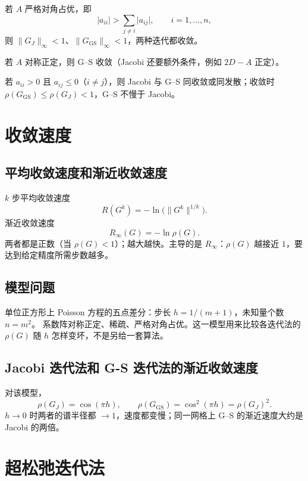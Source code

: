 若 \(A\) 严格对角占优，即
\[
\lvert a_{ii}\rvert>\sum_{j\neq i}\lvert a_{ij}\rvert,\qquad i=1,\ldots,n,
\]
则 \(\lVert G_J\rVert_{\infty}<1\)、\(\lVert G_{\mathrm{GS}}\rVert_{\infty}<1\)，两种迭代都收敛。

若 \(A\) 对称正定，则 G--S 收敛（Jacobi 还要额外条件，例如 \(2D-A\) 正定）。

若 \(a_{ii}>0\) 且 \(a_{ij}\le 0\)（\(i\neq j\)），则 Jacobi 与 G--S 同收敛或同发散；收敛时 \(\rho(G_{\mathrm{GS}})\le\rho(G_J)<1\)，G--S 不慢于 Jacobi。

\section{收敛速度}

\subsection{平均收敛速度和渐近收敛速度}

\(k\) 步平均收敛速度
\begin{equation}
R(G^k)=-\ln\bigl(\lVert G^k\rVert^{1/k}\bigr).
\end{equation}
渐近收敛速度
\begin{equation}
R_{\infty}(G)=-\ln\rho(G).
\end{equation}
两者都是正数（当 \(\rho(G)<1\)）；越大越快。主导的是 \(R_{\infty}\)：\(\rho(G)\) 越接近 \(1\)，要达到给定精度所需步数越多。

\subsection{模型问题}

单位正方形上 Poisson 方程的五点差分：步长 \(h=1/(m+1)\)，未知量个数 \(n=m^{2}\)。
系数阵对称正定、稀疏、严格对角占优。这一模型用来比较各迭代法的 \(\rho(G)\) 随 \(h\) 怎样变坏，不是另给一套算法。

\subsection{Jacobi 迭代法和 G-S 迭代法的渐近收敛速度}

对该模型，
\begin{equation}
\rho(G_J)=\cos(\pi h),\qquad
\rho(G_{\mathrm{GS}})=\cos^{2}(\pi h)=\rho(G_J)^{2}.
\end{equation}
\(h\to 0\) 时两者的谱半径都 \(\to 1\)，速度都变慢；同一网格上 G--S 的渐近速度大约是 Jacobi 的两倍。

\section{超松弛迭代法}


